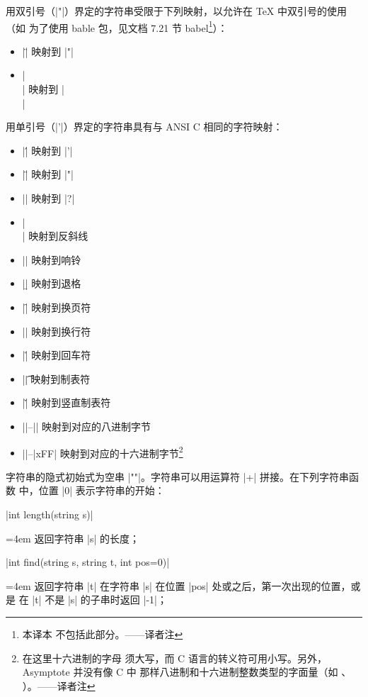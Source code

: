\documentclass[nofonts,CJKnormalspaces]{ctexbook}[2009/05/20]
\makeatletter
\newenvironment{funclist}{\trivlist
  \parindent=0pt
\item[]
  \def\item{\medskip\par\leftskip=0pt}
  \def\go{\par\leftskip=4em}}
{\endtrivlist}
\newenvironment{typelist}{\itemize
  \let\old@item\@item
  \def\@item[##1]{\expandafter\old@item[\ttfamily\color{type!50!black}##1]}}
{\enditemize}
\newcommand*\prgname[1]{\textsf{#1}}
\newcommand\transnote[1]{\footnote{#1——译者注}}
\makeatother
\begin{document}
\begin{typelist}
用双引号（|"|）界定的字符串受限于下列映射，以允许在 \TeX{} 中双引号的使用（如
为了使用 \prgname{bable} 包，见文档 7.21 节 \prgname{babel}\transnote{本译本
不包括此部分。}）：
\begin{itemize}
  \item |\"| 映射到 |"|
  \item |\\| 映射到 |\\|
\end{itemize}

用单引号（|'|）界定的字符串具有与 ANSI C 相同的字符映射：
\begin{itemize}
  \item |\'| 映射到 |'|
  \item |\"| 映射到 |"|
  \item |\?| 映射到 |?|
  \item |\\| 映射到反斜线
  \item |\a| 映射到响铃
  \item |\b| 映射到退格
  \item |\f| 映射到换页符
  \item |\n| 映射到换行符
  \item |\r| 映射到回车符
  \item |\t| 映射到制表符
  \item |\v| 映射到竖直制表符
  \item |\0|--|| 映射到对应的八进制字节
  \item ||--|xFF| 映射到对应的十六进制字节\transnote{在这里十六进制的字母
须大写，而 C 语言的转义符可用小写。另外，\prgname{Asymptote} 并没有像 C 中
那样八进制和十六进制整数类型的字面量（如 \inlinecode{0177}、
\inlinecode{0x2F}）。}
\end{itemize}

字符串的隐式初始式为空串 |""|。字符串可以用运算符 |+| 拼接。在下列字符串函数
中，位置 |0| 表示字符串的开始：
\begin{funclist}
\item |int length(string s)| \go
  返回字符串 |s| 的长度；

\item |int find(string s, string t, int pos=0)| \go
  返回字符串 |t| 在字符串 |s| 在位置 |pos| 处或之后，第一次出现的位置，或是
  在 |t| 不是 |s| 的子串时返回 |-1|；


\end{funclist}
\end{typelist}
\end{document}
